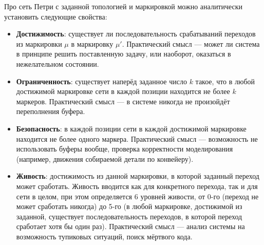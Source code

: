 \documentclass[a4, 14pt]{article}
\begin{document}
Про сеть Петри с заданной топологией и маркировкой можно аналитически установить 
следующие свойства:
\begin{itemize}
  \item \textbf{Достижимость}: существует ли последовательность срабатываний переходов из 
    маркировки $\mu$ в маркировку $\mu'$. Практический смысл --- может ли система 
    в принципе решить поставленную задачу, или наоборот, оказаться в нежелательном 
    состоянии.
  \item \textbf{Ограниченность}: существует наперёд заданное число $k$ такое, что в любой 
    достижимой маркировке сети в каждой позиции находится не более $k$ маркеров. 
    Практический смысл --- в системе никогда не произойдёт переполнения буфера.
  \item \textbf{Безопасность}: в каждой позиции сети в каждой достижимой маркировке 
    находится не более одного маркера. Практический смысл --- возможность не 
    использовать буферы вообще, проверка корректности моделирования (например, 
    движения собираемой детали по конвейеру).
  \item \textbf{Живость}: достижимость из данной маркировки, в которой заданный 
    переход может сработать. Живость вводится как для конкретного перехода, так 
    и для сети в целом, при этом определяется 6 уровней живости, от 0-го (переход 
    не может сработать никогда) до 5-го (в любой маркировке, достижимой из 
    заданной, существует последовательность переходов, в которой переход сработает 
    хотя бы один раз). Практический смысл --- анализ системы на возможность 
    тупиковых ситуаций, поиск мёртвого кода.
\end{itemize}
\end{document}
